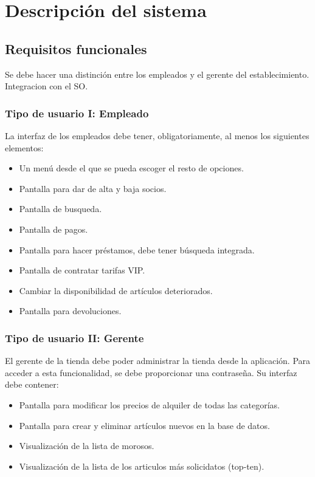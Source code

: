 \section{Descripción del sistema}
\subsection{Requisitos funcionales}
Se debe hacer una distinción entre los empleados y el gerente del establecimiento.
Integracion con el SO.

\subsubsection{Tipo de usuario I: Empleado}
La interfaz de los empleados debe tener, obligatoriamente, al menos los siguientes elementos:
\begin{itemize}
	\item Un menú desde el que se pueda escoger el resto de opciones.
	\item Pantalla para dar de alta y baja socios.
	\item Pantalla de busqueda.
	\item Pantalla de pagos.
	\item Pantalla para hacer préstamos, debe tener búsqueda integrada.
	\item Pantalla de contratar tarifas VIP.
	\item Cambiar la disponibilidad de artículos deteriorados.
	\item Pantalla para devoluciones.
\end{itemize}

\subsubsection{Tipo de usuario II: Gerente}
El gerente de la tienda debe poder administrar la tienda desde la aplicación. Para acceder a esta funcionalidad, se debe proporcionar una contraseña. Su interfaz debe contener:
\begin{itemize}
	\item Pantalla para modificar los precios de alquiler de todas las categorías.
	\item Pantalla para crear y eliminar artículos nuevos en la base de datos.
	\item Visualización de la lista de morosos.
	\item Visualización de la lista de los articulos más solicidatos (top-ten).
\end{itemize}

